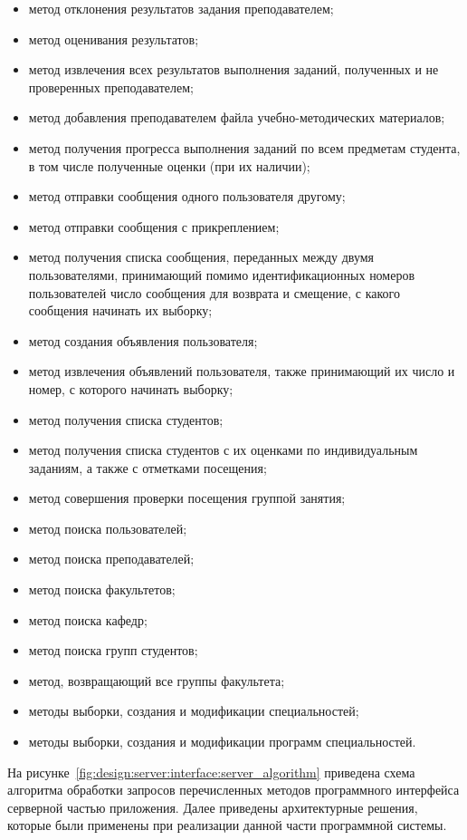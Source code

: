 \begin{itemize}
	\item метод отклонения результатов задания преподавателем;
	\item метод оценивания результатов;
	\item метод извлечения всех результатов выполнения заданий, полученных и не проверенных преподавателем;
	\item метод добавления преподавателем файла учебно-методических материалов;
	\item метод получения прогресса выполнения заданий по всем предметам студента, в том числе полученные оценки (при их наличии);
	\item метод отправки сообщения одного пользователя другому;
	\item метод отправки сообщения с прикреплением;
	\item метод получения списка сообщения, переданных между двумя пользователями, принимающий помимо идентификационных номеров пользователей число сообщения для возврата и смещение, с какого сообщения начинать их выборку;
	\item метод создания объявления пользователя;
	\item метод извлечения объявлений пользователя, также принимающий их число и номер, с которого начинать выборку;
	\item метод получения списка студентов;
	\item метод получения списка студентов с их оценками по индивидуальным заданиям, а также с отметками посещения;
	\item метод совершения проверки посещения группой занятия;
	\item метод поиска пользователей;
	\item метод поиска преподавателей;
	\item метод поиска факультетов;
	\item метод поиска кафедр;
	\item метод поиска групп студентов;
	\item метод, возвращающий все группы факультета;
	\item методы выборки, создания и модификации специальностей;
	\item методы выборки, создания и модификации программ специальностей.
\end{itemize}

На рисунке~\ref{fig:design:server:interface:server_algorithm} приведена схема алгоритма обработки запросов перечисленных методов программного интерфейса серверной частью приложения. Далее приведены архитектурные решения, которые были применены при реализации данной части программной системы. 

